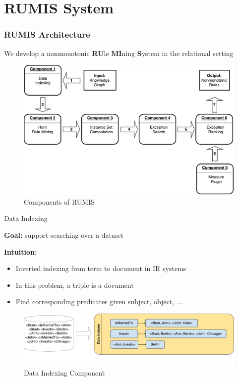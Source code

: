 \documentclass{beamer}
\newcommand{\makeoverview}{%
  \begin{frame}
    \frametitle{Outline}
    \tableofcontents
  \end{frame}
}
\begin{document}
\section{RUMIS System}


\begin{frame}\frametitle{RUMIS Architecture}

\bigskip
We develop a nonmonotonic \textbf{RU}le \textbf{MI}ning \textbf{S}ystem in the relational setting
\smallskip

\begin{figure}[h]
	\centering
	\includegraphics[page=1,width=.85\textwidth]{system_overview.pdf}
	\caption{Components of RUMIS}
\end{figure}

\end{frame}

\begin{frame}{Data Indexing}

\textbf{Goal:} support searching over a dataset
\smallskip

\textbf{Intuition:} 
\begin{itemize}
	\item Inverted indexing from term to document in IR systems
  	\item In this problem, a triple is a document
  	\item Find corresponding predicates given subject, object, ...
\end{itemize}

\begin{figure}[h]
	\centering
	\includegraphics[page=1,width=1.0\textwidth]{data_indexing.pdf}
	\caption{Data Indexing Component}
\end{figure}

\end{frame}
\end{document}
